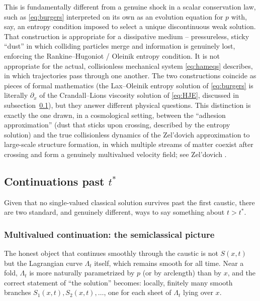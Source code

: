 This is fundamentally different from a genuine shock in a scalar conservation
law, such as \eqref{eq:burgers} interpreted on its own as an evolution equation
for $p$ with, say, an entropy condition imposed to select a unique
discontinuous weak solution. That construction is appropriate for a dissipative
medium -- pressureless, sticky ``dust'' in which colliding particles merge and
information is genuinely lost, enforcing the Rankine--Hugoniot / Oleinik
entropy condition. It is not appropriate for the actual, collisionless
mechanical system \eqref{eq:hameqs} describes, in which trajectories pass
through one another. The two constructions coincide as pieces of formal
mathematics (the Lax--Oleinik entropy solution of \eqref{eq:burgers} is
literally $\partial_x$ of the Crandall--Lions viscosity solution of
\eqref{eq:HJE}, discussed in subsection~\ref{sec:continuations}), but they answer
different physical questions. This distinction is exactly the one drawn, in a
cosmological setting, between the ``adhesion approximation'' (dust that sticks
upon crossing, described by the entropy solution) and the true collisionless
dynamics of the Zel'dovich approximation to large-scale structure formation, in
which multiple streams of matter coexist after crossing and form a genuinely
multivalued velocity field; see Zel'dovich \cite{Zeldovich}.

\subsection{Continuations past \texorpdfstring{$t^\ast$}{t*}}
\label{sec:continuations}

Given that no single-valued classical solution survives past the first caustic,
there are two standard, and genuinely different, ways to say something about
$t>t^\ast$.

\subsubsection{Multivalued continuation: the semiclassical picture}

The honest object that continues smoothly through the caustic is not $S(x,t)$
but the Lagrangian curve $\Lambda_t$ itself, which remains smooth for all time.
Near a fold, $\Lambda_t$ is more naturally parametrized by $p$ (or by
arclength) than by $x$, and the correct statement of ``the solution'' becomes:
locally, finitely many smooth branches $S_1(x,t),S_2(x,t),\dots$, one for each
sheet of $\Lambda_t$ lying over $x$.

